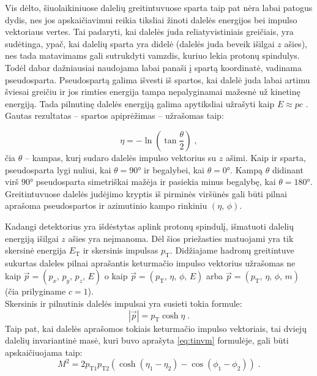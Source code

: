 \documentclass[a4paper, 12pt]{article}
\newlength\q
\begin{document}
Vis dėlto, šiuolaikiniuose dalelių greitintuvuose sparta taip pat nėra labai patogus dydis, nes jos apskaičiavimui reikia tiksliai žinoti dalelės energijos bei impulso vektoriaus vertes. Tai padaryti, kai dalelės juda reliatyvistiniais greičiais, yra sudėtinga, ypač, kai dalelių sparta yra didelė (dalelės juda beveik išilgai $z$ ašies), nes tada matavimams gali sutrukdyti vamzdis, kuriuo lekia protonų spindulys. Todėl dabar dažniausiai naudojama labai panaši į spartą koordinatė, vadinama pseudosparta. Pseudospartą galima išvesti iš spartos, kai dalelė juda labai artimu šviesai greičiu ir jos rimties energija tampa nepalyginamai mažesnė už kinetinę energiją. Tada pilnutinę dalelės energiją galima apytiksliai užrašyti kaip $E\approx pc$ \cite{pseudorapidity}. Gautas rezultatas -- spartos apiprėžimas -- užrašomas taip:

\begin{equation}
\eta = -\ln \left( \tan \frac{\theta}{2} \right) \; \mathrm{,}
\label{eq:eta}
\end{equation}
čia $\theta$ -- kampas, kurį sudaro dalelės impulso vektorius su $z$ ašimi. Kaip ir sparta, pseudosparta lygi nuliui, kai $\theta=\ang{90}$ ir begalybei, kai $\theta=\ang{0}$. Kampą $\theta$ didinant virš $\ang{90}$ pseudosparta simetriškai mažėja ir pasiekia minus begalybę, kai $\theta=\ang{180}$. Greitintuvuose dalelės judėjimo kryptis iš pirminės viršūnės gali būti pilnai aprašoma pseudospartos ir azimutinio kampo rinkiniu $(\eta, \, \phi)$.

Kadangi detektorius yra išdėstytas aplink protonų spindulį, išmatuoti dalelių energiją išilgai $z$ ašies yra neįmanoma. Dėl šios priežasties matuojami yra tik skersinė energija $E_{\mathrm{T}}$ ir skersinis impulsas $p_{\mathrm{T}}$. Didžiajame hadronų greitintuve sukurtas daleles pilnai aprašantis keturmačio impulso vektorius užrašomas ne kaip $\vec{p}=(p_{x}, \, p_{y}, \, p_{z}, \, E)$ o kaip $\vec{p}=(p_{\mathrm{T}}, \, \eta, \, \phi, \, E)$ arba $\vec{p}=(p_{\mathrm{T}}, \, \eta, \, \phi, \, m)$ (čia prilyginame $c=1$).\\
Skersinis ir pilnutinis dalelės impulsai yra susieti tokia formule:
\begin{equation}
|\vec p|=p_{\mathrm{T}}\cosh\eta \; .
\label{eq:pmodpt}
\end{equation}
Taip pat, kai dalelės aprašomos tokiais keturmačio impulso vektoriais, tai dviejų dalelių invariantinė masė, kuri buvo aprašyta \eqref{eq:tinvm} formulėje, gali būti apskaičiuojama taip:
\begin{equation}
M^2=2p_{\mathrm{T}1}p_{\mathrm{T}2}(\cosh(\eta_{1}-\eta_{2})-\cos(\phi_{1}-\phi_{2})) \; .
\label{eq:ainvm}
\end{equation} 
\end{document}
